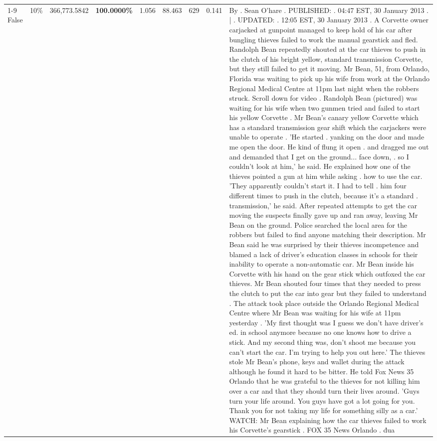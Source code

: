 \begin{table}[H]
\begin{tabular}{lllrlllll}
\cline{1-9} \cline{2-9}
False & 10\% & 366,773.5842 & \bfseries \color{red} 100.0000\% & 1.056 & 88.463 & 629 & 0.141 & By . Sean O'hare . PUBLISHED: . 04:47 EST, 30 January 2013 . | . UPDATED: . 12:05 EST, 30 January 2013 . A Corvette owner carjacked at gunpoint managed to keep hold of his car after bungling thieves failed to work the manual gearstick and fled. Randolph Bean repeatedly shouted at the car thieves to push in the clutch of his bright yellow, standard transmission Corvette, but they still failed to get it moving. Mr Bean, 51, from Orlando, Florida was waiting to pick up his wife from work at the Orlando Regional Medical Centre at 11pm last night when the robbers struck. Scroll down for video . Randolph Bean (pictured) was waiting for his wife when two gunmen tried and failed to start his yellow Corvette . Mr Bean's canary yellow Corvette which has a standard transmission gear shift which the carjackers were unable to operate . 'He started . yanking on the door and made me open the door. He kind of flung it open . and dragged me out and demanded that I get on the ground... face down, . so I couldn't look at him,' he said. He explained how one of the thieves pointed a gun at him while asking . how to use the car. 'They apparently couldn't start it. I had to tell . him four different times to push in the clutch, because it's a standard . transmission,' he said. After repeated attempts to get the car moving the suspects finally gave up and ran away, leaving Mr Bean on the ground. Police searched the local area for the robbers but failed to find anyone matching their description. Mr Bean said he was surprised by their thieves incompetence and blamed a lack of driver's education classes in schools for their inability to operate a non-automatic car. Mr Bean inside his Corvette with his hand on the gear stick which outfoxed the car thieves. Mr Bean shouted four times that they needed to press the clutch to put the car into gear but they failed to understand . The attack took place outside the Orlando Regional Medical Centre where Mr Bean was waiting for his wife at 11pm yesterday . 'My first thought was I guess we don't have driver's ed. in school anymore because no one knows how to drive a stick. And my second thing was, don't shoot me because you can't start the car. I'm trying to help you out here.' The thieves stole Mr Bean's phone, keys and wallet during the attack although he found it hard to be bitter. He told Fox News 35 Orlando that he was grateful to the thieves for not killing him over a car and that they should turn their lives around. 'Guys turn your life around. You guys have got a lot going for you. Thank you for not taking my life for something silly as a car.' WATCH: Mr Bean explaining how the car thieves failed to work his Corvette's gearstick . FOX 35 News Orlando . đua \\

\end{tabular}
\end{table}
